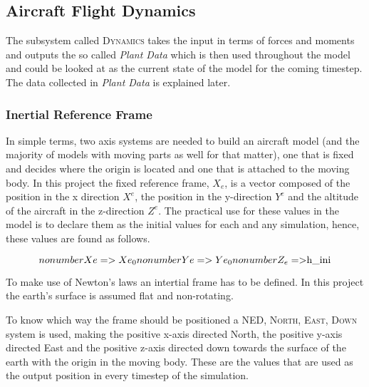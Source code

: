 \subsection{Aircraft Flight Dynamics}

The subsystem called \textsc{Dynamics} takes the input in terms of forces and moments and outputs the so called \textit{Plant Data} which is then used throughout the model and could be looked at as the current state of the model for the coming timestep. The data collected in \textit{Plant Data} is explained later.

\subsubsection{Inertial Reference Frame}

In simple terms, two axis systems are needed to build an aircraft model (and the majority of models with moving parts as well for that matter), one that is fixed and decides where the origin is located and one that is attached to the moving body. In this project the fixed reference frame, \textbf{$X_e$}, is a vector composed of the position in the x direction $X^e$, the position in the y-direction $Y^e$ and the altitude of the aircraft in the z-direction $Z^e$. The practical use for these values in the model is to declare them as the initial values for each and any simulation, hence, these values are found as follows.

\begin{equation}
 nonumber Xe => Xe_0
 nonumber Ye => Ye_0
 nonumber Z_e => $h\_{ini}$
\end{equation}


%
%
To make use of Newton's laws an intertial frame has to be defined. In this project the earth's surface is assumed flat and non-rotating.
%

To know which way the frame should be positioned a \textsc{NED, North, East, Down} system is used, making the positive x-axis directed North, the positive y-axis directed East and the positive z-axis directed down towards the surface of the earth with the origin in the moving body. These are the values that are used as the output position in every timestep of the simulation.

